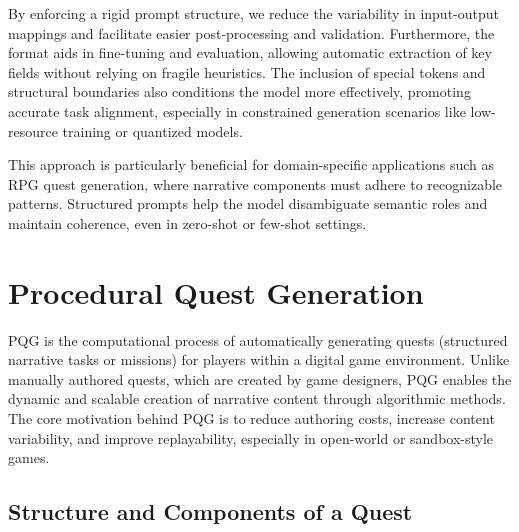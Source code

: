 By enforcing a rigid prompt structure, we reduce the variability in input-output mappings
and facilitate easier post-processing and validation. Furthermore, the format aids
in fine-tuning and evaluation, allowing automatic extraction of key fields without relying
on fragile heuristics. The inclusion of special tokens and structural boundaries also
conditions the model more effectively, promoting accurate task alignment, especially in
constrained generation scenarios like low-resource training or quantized models.

This approach is particularly beneficial for domain-specific applications such as RPG
quest generation, where narrative components must adhere to recognizable patterns.
Structured prompts help the model disambiguate semantic roles and maintain coherence,
even in zero-shot or few-shot settings.

\section{Procedural Quest Generation}

PQG is the computational process of automatically generating quests (structured narrative
tasks or missions) for players within a digital game environment. Unlike manually
authored quests, which are created by game designers, PQG enables the dynamic and
scalable creation of narrative content through algorithmic methods. The core motivation
behind PQG is to reduce authoring costs, increase content variability, and improve
replayability, especially in open-world or sandbox-style games.

\subsection{Structure and Components of a Quest}

